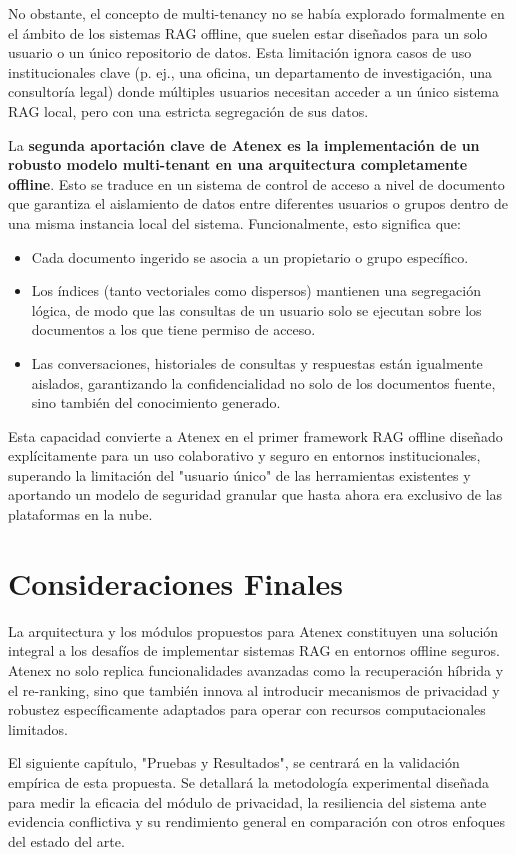 No obstante, el concepto de multi-tenancy no se había explorado formalmente en el ámbito de los sistemas RAG offline, que suelen estar diseñados para un solo usuario o un único repositorio de datos. Esta limitación ignora casos de uso institucionales clave (p. ej., una oficina, un departamento de investigación, una consultoría legal) donde múltiples usuarios necesitan acceder a un único sistema RAG local, pero con una estricta segregación de sus datos.

La \textbf{segunda aportación clave de Atenex es la implementación de un robusto modelo multi-tenant en una arquitectura completamente offline}. Esto se traduce en un sistema de control de acceso a nivel de documento que garantiza el aislamiento de datos entre diferentes usuarios o grupos dentro de una misma instancia local del sistema. Funcionalmente, esto significa que:
\begin{itemize}
    \item Cada documento ingerido se asocia a un propietario o grupo específico.
    \item Los índices (tanto vectoriales como dispersos) mantienen una segregación lógica, de modo que las consultas de un usuario solo se ejecutan sobre los documentos a los que tiene permiso de acceso.
    \item Las conversaciones, historiales de consultas y respuestas están igualmente aislados, garantizando la confidencialidad no solo de los documentos fuente, sino también del conocimiento generado.
\end{itemize}
Esta capacidad convierte a Atenex en el primer framework RAG offline diseñado explícitamente para un uso colaborativo y seguro en entornos institucionales, superando la limitación del "usuario único" de las herramientas existentes y aportando un modelo de seguridad granular que hasta ahora era exclusivo de las plataformas en la nube.

\section{Consideraciones Finales}

La arquitectura y los módulos propuestos para Atenex constituyen una solución integral a los desafíos de implementar sistemas RAG en entornos offline seguros. Atenex no solo replica funcionalidades avanzadas como la recuperación híbrida y el re-ranking, sino que también innova al introducir mecanismos de privacidad y robustez específicamente adaptados para operar con recursos computacionales limitados.

El siguiente capítulo, "Pruebas y Resultados", se centrará en la validación empírica de esta propuesta. Se detallará la metodología experimental diseñada para medir la eficacia del módulo de privacidad, la resiliencia del sistema ante evidencia conflictiva y su rendimiento general en comparación con otros enfoques del estado del arte.